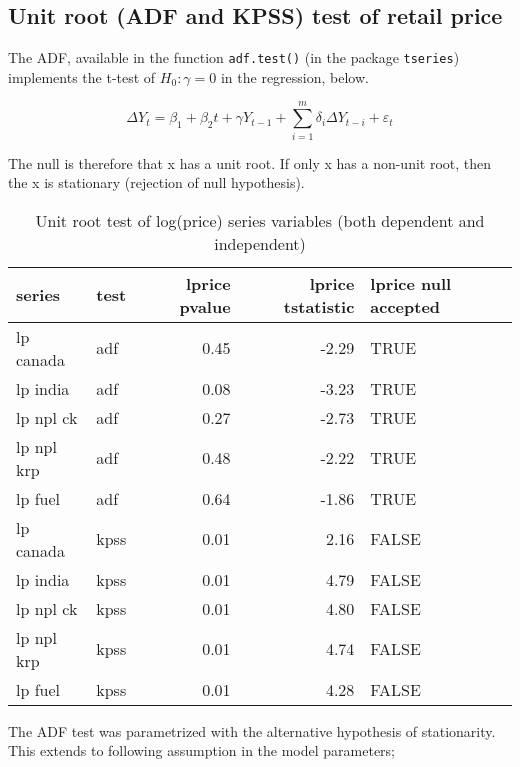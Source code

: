 \documentclass[
  12pt,
]{article}
\begin{document}
\hypertarget{unit-root-adf-and-kpss-test-of-retail-price}{%
\subsection{Unit root (ADF and KPSS) test of retail price}\label{unit-root-adf-and-kpss-test-of-retail-price}}

The ADF, available in the function \texttt{adf.test()} (in the package \texttt{tseries}) implements the t-test of \(H_0: \gamma = 0\) in the regression, below.

\begin{equation}
\label{eqn:lagged-ts-regression}
  \Delta {{Y}_{t}}={{\beta
  }_{1}}+{{\beta }_{2}}t+\gamma {{Y}_{t-1}}+ \sum\limits_{i=1}^{m}{\delta_i \Delta
    {{Y}_{t-i}}+{{\varepsilon }_{t}}}
\end{equation}

The null is therefore that x has a unit root. If only x has a non-unit root, then the x is stationary (rejection of null hypothesis).

\begin{table}

\caption{\label{tab:adf-kpss-test-retail}Unit root test of log(price) series variables (both dependent and independent)}
\centering
\begin{tabular}[t]{>{\raggedright\arraybackslash}p{8em}lrrl}
\toprule
series & test & lprice pvalue & lprice tstatistic & lprice null accepted\\
\midrule
lp canada & adf & 0.45 & -2.29 & TRUE\\
lp india & adf & 0.08 & -3.23 & TRUE\\
lp npl ck & adf & 0.27 & -2.73 & TRUE\\
lp npl krp & adf & 0.48 & -2.22 & TRUE\\
lp fuel & adf & 0.64 & -1.86 & TRUE\\
\addlinespace
lp canada & kpss & 0.01 & 2.16 & FALSE\\
lp india & kpss & 0.01 & 4.79 & FALSE\\
lp npl ck & kpss & 0.01 & 4.80 & FALSE\\
lp npl krp & kpss & 0.01 & 4.74 & FALSE\\
lp fuel & kpss & 0.01 & 4.28 & FALSE\\
\bottomrule
\end{tabular}
\end{table}

The ADF test was parametrized with the alternative hypothesis of stationarity. This extends to following assumption in the model parameters;
\end{document}
